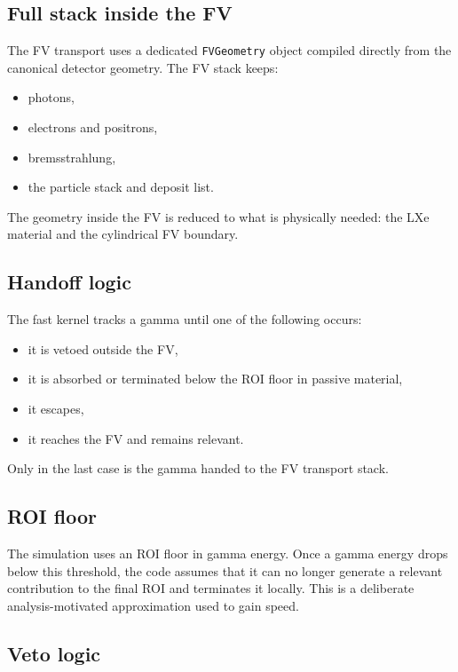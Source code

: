 \documentclass[11pt]{article}
\begin{document}
\subsection{Full stack inside the FV}

The FV transport uses a dedicated \texttt{FVGeometry} object compiled directly
from the canonical detector geometry. The FV stack keeps:

\begin{itemize}
\item photons,
\item electrons and positrons,
\item bremsstrahlung,
\item the particle stack and deposit list.
\end{itemize}

The geometry inside the FV is reduced to what is physically needed:
the LXe material and the cylindrical FV boundary.

\subsection{Handoff logic}

The fast kernel tracks a gamma until one of the following occurs:

\begin{itemize}
\item it is vetoed outside the FV,
\item it is absorbed or terminated below the ROI floor in passive material,
\item it escapes,
\item it reaches the FV and remains relevant.
\end{itemize}

Only in the last case is the gamma handed to the FV transport stack.

\subsection{ROI floor}

The simulation uses an ROI floor in gamma energy. Once a gamma energy drops
below this threshold, the code assumes that it can no longer generate a relevant
contribution to the final ROI and terminates it locally. This is a deliberate
analysis-motivated approximation used to gain speed.

\subsection{Veto logic}
\end{document}
